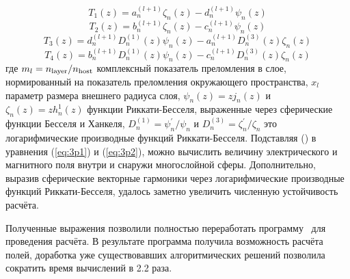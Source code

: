 \begin{equation*}
  T_1(z) =   a^{(l+1)}_{n}  \zeta_{n}(z) 
           - d^{(l+1)}_{n}  \psi_{n}(z)
\end{equation*}
\begin{equation*}
  T_2(z) =   b^{(l+1)}_{n}  \zeta_{n}(z) 
           - c^{(l+1)}_{n}  \psi_{n}(z)
\end{equation*}
\begin{equation*}
  T_3(z) =  d^{(l+1)}_{n}  D^{(1)}_{n}(z)  \psi_{n}(z) 
          - a^{(l+1)}_{n}  D^{(3)}_{n}(z)  \zeta_{n} (z)
\end{equation*}
\begin{equation*}
  T_4(z) =  b^{(l+1)}_{n}  D^{(1)}_{n}(z)  \psi_{n}(z) 
          - c^{(l+1)}_{n}  D^{(3)}_{n}(z)  \zeta_{n} (z)
\end{equation*}
где $m_l = n_{\rm layer}/n_{\rm host}$ комплексный показатель
преломления в слое, нормированный на показатель преломления
окружающего пространства, $x_l$ параметр размера внешнего радиуса
слоя, $\psi_{n}(z) = z j_n(z)$ и $\zeta_{n}(z) = z h_n^1(z)$ функции
Риккати-Бесселя, выраженные через сферические функции Бесселя и
Ханкеля, $D^{(1)}_{n} = \psi^{\prime}_{n}/\psi_{n}$ и
$D^{(3)}_{n} = \zeta^{\prime}_{n}/\zeta_{n}$ это логарифмические
производные функций Риккати-Бесселя. Подставляя
() в уравнения (\ref{eq:3p1}) и
(\ref{eq:3p2}), можно вычислить величину электрического и магнитного
поля внутри и снаружи многослойной сферы. Дополнительно, выразив
сферические векторные гармоники через логарифмические производные
функций Риккати-Бесселя, удалось заметно увеличить численную
устойчивость расчёта.

Полученные выражения позволили полностью переработать
программу~\cite{Scattnlay-web} для проведения расчёта.  В результате
программа получила возможность расчёта полей, доработка уже
существовавших алгоритмических решений позволила сократить время
вычислений в 2.2 раза.

